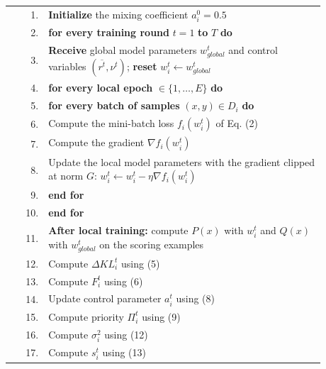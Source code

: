 \documentclass[pdflatex,sn-mathphys-num,oneside]{sn-jnl}%
\theoremstyle{thmstyleone}%
\theoremstyle{thmstyletwo}%
\theoremstyle{thmstylethree}%
\begin{document}
\noindent\begin{tabular}{r@{\hspace{0.7em}}p{0.88\linewidth}}
1.  & \textbf{Initialize} the mixing coefficient $a^0_i = 0.5$\\
2.  & \textbf{for every training round} $t = 1$ \textbf{to} $T$ \textbf{do}\\
3.  & \hspace{1em}\textbf{Receive} global model parameters $w^t_{global}$ and control variables $(\overline{r^t}, \nu^{t})$; \textbf{reset} $w^t_i \leftarrow w^t_{global}$\\
4.  & \hspace{1em}\textbf{for every local epoch} $\in \{1, \ldots, E\}$ \textbf{do}\\
5.  & \hspace{2em}\textbf{for every batch of samples} $(x,y) \in D_i$ \textbf{do}\\
6.  & \hspace{3em}Compute the mini-batch loss $f_i(w^t_i)$ of Eq. (2)\\
7.  & \hspace{3em}Compute the gradient $\nabla f_i(w^t_i)$\\
8.  & \hspace{3em}Update the local model parameters with the gradient clipped at norm $G$: $w^t_i \leftarrow w^t_i - \eta \nabla f_i(w^t_i)$\\
9.  & \hspace{2em}\textbf{end for}\\
10. & \hspace{1em}\textbf{end for}\\
11. & \hspace{1em}\textbf{After local training:} compute $P(x)$ with $w^t_i$ and $Q(x)$ with $w^t_{global}$ on the scoring examples\\
12. & \hspace{2em}Compute $\Delta KL^t_i$ using (5)\\
13. & \hspace{2em}Compute $F^t_i$ using (6)\\
14. & \hspace{2em}Update control parameter $a^t_i$ using (8)\\
15. & \hspace{2em}Compute priority $\Pi^t_i$ using (9)\\
16. & \hspace{2em}Compute $\sigma^2_i$ using (12)\\
17. & \hspace{2em}Compute $s^t_i$ using (13)\\

\end{tabular}
\end{document}
